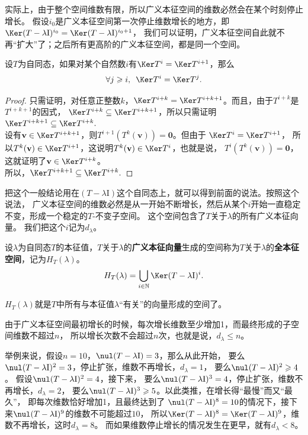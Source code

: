 \documentclass[12pt,UTF8,fontset=none]{ctexbook}
\begin{document}
实际上，由于整个空间维数有限，所以广义本征空间的维数必然会在某个时刻停止增长。
假设$i_0$是广义本征空间第一次停止维数增长的地方，即$\Ker (T - \lambda\mathrm{I})^{i_0} = \Ker (T - \lambda\mathrm{I})^{i_0+1}$，
我们可以证明，广义本征空间自此就不再“扩大”了；之后所有更高阶的广义本征空间，都是同一个空间。
\begin{pp}\label{pp:6_12_2}
    设$T$为自同态，如果对某个自然数$i$有$\Ker T^{i} = \Ker T^{i+1}$，那么
    $$ \forall j \geqslant i, \,\,\, \Ker T^{i} = \Ker T^{j}.$$
\end{pp}
\begin{proof} %
    只需证明，对任意正整数$k$，$\Ker T^{i+k} = \Ker T^{i+k+1}$。而且，由于$T^{i+k}$是$T^{i+k+1}$的因式，
    $\Ker T^{i+k} \subseteq \Ker T^{i+k+1}$，所以只需证明$\Ker T^{i+k+1} \subseteq \Ker T^{i+k}.$\\
    设有$\mathbf{v}\in\Ker T^{i+k+1}$，则$T^{i+1}(T^k(\mathbf{v})) = \mathbf{0}$。但由于 $\Ker T^{i} = \Ker T^{i+1}$，
    所以$T^k(\mathbf{v}) \in \Ker T^{i+1} $，这说明$T^k(\mathbf{v}) \in \Ker T^{i}$，也就是说，
    $T^{i}(T^k(\mathbf{v})) = \mathbf{0}$，这就证明了$\mathbf{v}\in\Ker T^{i+k}$。\\
    所以，$\Ker T^{i+k+1} \subseteq \Ker T^{i+k}.$

\end{proof}

把这个一般结论用在$(T - \lambda\mathrm{I})$这个自同态上，就可以得到前面的说法。按照这个说法，
广义本征空间的维数必然是从一开始不断增长，然后从某个$i$开始一直稳定不变，形成一个稳定的$T$-不变子空间。
这个空间包含了$T$关于$\lambda$的所有广义本征向量。
我们把这个$i$记为$d_\lambda$。
\begin{df}\label{df:6_4_2}
    设$\lambda$为自同态$T$的本征值，$T$关于$\lambda$的\textbf{广义本征向量}生成的空间称为$T$关于$\lambda$的\textbf{全本征空间}，记为$H_T(\lambda)$。
    $$ H_T(\lambda) = \bigcup_{i\in\mathbb{N}} \Ker (T - \lambda\mathrm{I})^i.$$
\end{df}
$H_T(\lambda)$就是$T$中所有与本征值$\lambda$“有关”的向量形成的空间了。

由于广义本征空间最初增长的时候，每次增长维数至少增加1，而最终形成的子空间维数不超过$n$，
所以增长次数不会超过$n$次，也就是说，$d_\lambda\leqslant n$。

举例来说，假设$n=10$，$\nul (T - \lambda\mathrm{I}) = 3$，那么从此开始，
要么$\nul (T - \lambda\mathrm{I})^2 = 3$，停止扩张，维数不再增长，$d_\lambda=1$，
要么$\nul (T - \lambda\mathrm{I})^2 \geqslant 4$。
假设$\nul (T - \lambda\mathrm{I})^2 = 4$，接下来，
要么$\nul (T - \lambda\mathrm{I})^3 = 4$，停止扩张，维数不再增长，$d_\lambda=2$，
要么$\nul (T - \lambda\mathrm{I})^3 \geqslant 5$。以此类推，在增长得“最慢”而又“最久”，
即每次维数恰好增加1，且最终达到了
$\nul (T - \lambda\mathrm{I})^8 = 10$的情况下，接下来$\nul (T - \lambda\mathrm{I})^9$的维数不可能超过$10$，
所以$\Ker (T - \lambda\mathrm{I})^8 = \Ker (T - \lambda\mathrm{I})^9$，维数不再增长，这时$d_\lambda=8$。
而如果维数停止增长的情况发生在更早，就有$d_\lambda<8$。
\end{document}

